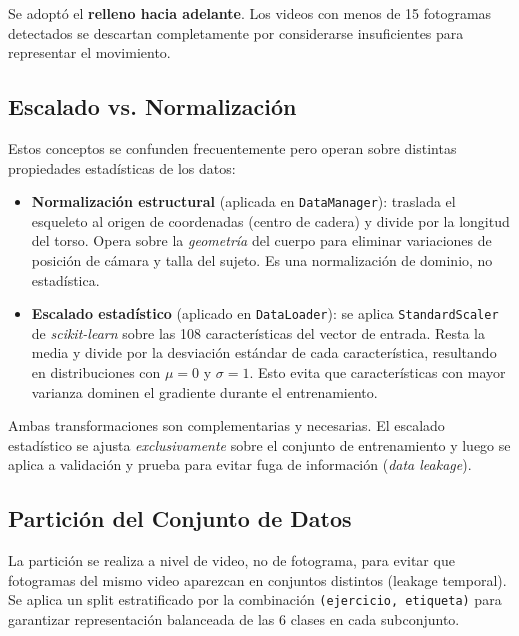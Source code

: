 \documentclass[conference]{IEEEtran}
\begin{document}
Se adoptó el \textbf{relleno hacia adelante}. Los videos con
menos de 15 fotogramas detectados se descartan completamente
por considerarse insuficientes para representar el movimiento.

\subsection{Escalado vs. Normalización}

Estos conceptos se confunden frecuentemente pero operan sobre
distintas propiedades estadísticas de los datos:

\begin{itemize}
  \item \textbf{Normalización estructural} (aplicada en
        \texttt{DataManager}): traslada el esqueleto al origen
        de coordenadas (centro de cadera) y divide por la
        longitud del torso. Opera sobre la \textit{geometría}
        del cuerpo para eliminar variaciones de posición de
        cámara y talla del sujeto. Es una normalización de
        dominio, no estadística.

  \item \textbf{Escalado estadístico} (aplicado en
        \texttt{DataLoader}): se aplica \texttt{StandardScaler}
        de \textit{scikit-learn} sobre las 108 características
        del vector de entrada. Resta la media y divide por la
        desviación estándar de cada característica, resultando
        en distribuciones con $\mu = 0$ y $\sigma = 1$.
        Esto evita que características con mayor varianza
        dominen el gradiente durante el entrenamiento.
\end{itemize}

Ambas transformaciones son complementarias y necesarias.
El escalado estadístico se ajusta \textit{exclusivamente} sobre
el conjunto de entrenamiento y luego se aplica a validación y
prueba para evitar fuga de información (\textit{data leakage}).

\subsection{Partición del Conjunto de Datos}

La partición se realiza a nivel de video, no de fotograma,
para evitar que fotogramas del mismo video aparezcan en
conjuntos distintos (leakage temporal). Se aplica un split
estratificado por la combinación \texttt{(ejercicio, etiqueta)}
para garantizar representación balanceada de las 6 clases en
cada subconjunto.
\end{document}
